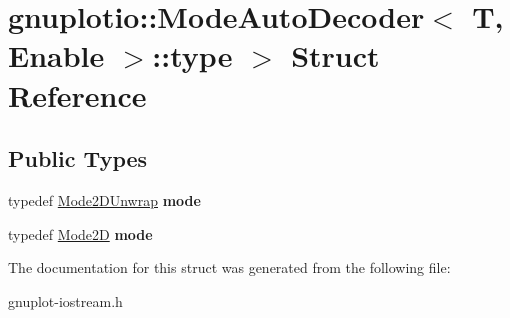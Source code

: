 \hypertarget{structgnuplotio_1_1ModeAutoDecoder_1_1type_01_4}{}\section{gnuplotio\+:\+:Mode\+Auto\+Decoder$<$ T, Enable $>$\+:\+:type $>$ Struct Reference}
\label{structgnuplotio_1_1ModeAutoDecoder_1_1type_01_4}
\subsection*{Public Types}
\begin{DoxyCompactItemize}
\item 
\mbox{\label{structgnuplotio_1_1ModeAutoDecoder_1_1type_01_4_ad1942745c810b24503495c6ade6bd9f6}} 
typedef \hyperlink{structgnuplotio_1_1Mode2DUnwrap}{Mode2\+D\+Unwrap} {\bfseries mode}
\item 
\mbox{\label{structgnuplotio_1_1ModeAutoDecoder_1_1type_01_4_a07e8af1d93e8107efb7be6fd68b0024c}} 
typedef \hyperlink{structgnuplotio_1_1Mode2D}{Mode2D} {\bfseries mode}
\end{DoxyCompactItemize}


The documentation for this struct was generated from the following file\+:\begin{DoxyCompactItemize}
\item 
gnuplot-\/iostream.\+h\end{DoxyCompactItemize}
